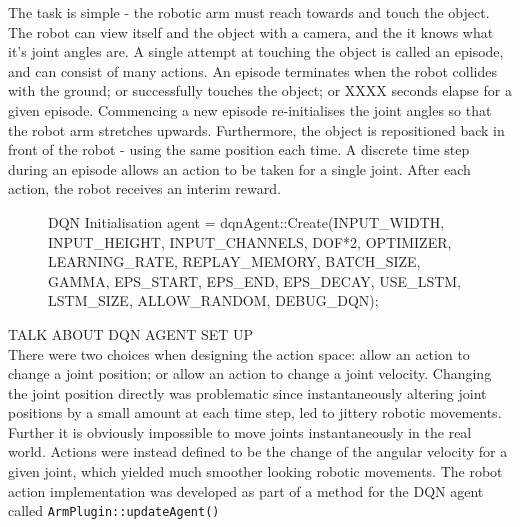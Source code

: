 \documentclass[a4paper]{article}
\begin{document}
The task is simple - the robotic arm must reach towards and touch the object. The robot can view itself and the object with a camera, and the it knows what it's joint angles are. A single attempt at touching the object is called an episode, and can consist of many actions. An episode terminates when the robot collides with the ground; or successfully touches the object; or XXXX seconds elapse for a given episode. Commencing a new episode re-initialises the joint angles so that the robot arm stretches upwards. Furthermore, the object is repositioned back in front of the robot - using the same position each time. A discrete time step during an episode allows an action to be taken for a single joint. After each action, the robot receives an interim reward.\\

\begin{figure}[h]\scriptsize
\begin{sexylisting}{DQN Initialisation}
agent = dqnAgent::Create(INPUT_WIDTH,
			 INPUT_HEIGHT,
			 INPUT_CHANNELS,
			 DOF*2,
			 OPTIMIZER,
			 LEARNING_RATE,
			 REPLAY_MEMORY,
			 BATCH_SIZE, 
		  	 GAMMA,
		  	 EPS_START,
		  	 EPS_END,
		  	 EPS_DECAY, 
		  	 USE_LSTM,
		  	 LSTM_SIZE,
		  	 ALLOW_RANDOM,
		  	 DEBUG_DQN);
\end{sexylisting}
\end{figure}

TALK ABOUT DQN AGENT SET UP\\

There were two choices when designing the action space: allow an action to change a joint position; or allow an action to change a joint velocity. Changing the joint position directly was problematic since instantaneously altering joint positions by a small amount at each time step, led to  jittery robotic movements. Further it is obviously impossible to move joints instantaneously in the real world. Actions were instead defined to be the change of the angular velocity for a given joint, which yielded much smoother looking robotic movements. The robot action implementation was developed as part of a method for the DQN agent called \texttt{ArmPlugin::updateAgent()}

\begin{figure}[h]\scriptsize
{}
\end{figure}
\end{document}
